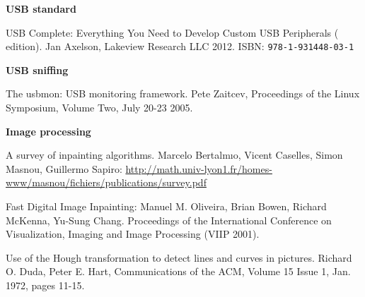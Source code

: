 \documentclass{article}
\begin{document}
\pagebreak

\renewcommand{\refname}{References}
\begin{thebibliography}{}

  \item[]\hspace{-\labelwidth}\hspace{-\labelsep}\textbf{USB standard}

   USB Complete: Everything You Need to Develop
               Custom USB Peripherals ( edition).
               Jan Axelson, Lakeview Research LLC 2012.
               ISBN: {\tt   978-1-931448-03-1}
               
  \item[]\hspace{-\labelwidth}\hspace{-\labelsep}\textbf{USB sniffing}
  
   The usbmon: USB monitoring framework. Pete Zaitcev,
  Proceedings of the Linux Symposium, Volume Two, July 20-23 2005.
  
  \item[]\hspace{-\labelwidth}\hspace{-\labelsep}\textbf{Image processing}
  
   A survey of inpainting algorithms. Marcelo Bertalmıo, Vicent Caselles, Simon Masnou,
  Guillermo Sapiro:
  \url{http://math.univ-lyon1.fr/homes-www/masnou/fichiers/publications/survey.pdf}
  
   Fast Digital Image Inpainting: Manuel M. Oliveira,
  Brian Bowen, Richard McKenna, Yu-Sung Chang. 
  Proceedings of the International Conference on Visualization, Imaging and Image Processing (VIIP 2001).
  
   Use of the Hough transformation to detect lines and curves in pictures.
  Richard O. Duda, Peter E. Hart, Communications of the ACM, Volume 15 Issue 1, Jan. 1972,
  pages 11-15.
  
  \setcounter{firstbib}{\value{enumiv}}
\end{thebibliography}
\end{document}
